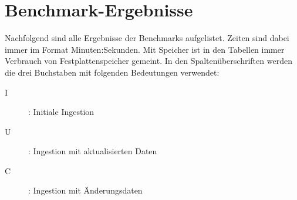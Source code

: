 \chapter{Benchmark-Ergebnisse}
\label{sec:benchmark-tables}
Nachfolgend sind alle Ergebnisse der Benchmarks aufgelistet.
Zeiten sind dabei immer im Format Minuten:Sekunden.
Mit Speicher ist in den Tabellen immer Verbrauch von Festplattenspeicher gemeint.
In den Spaltenüberschriften werden die drei Buchstaben mit folgenden Bedeutungen verwendet:
\begin{description}
    \item[I]: Initiale Ingestion
    \item[U]: Ingestion mit aktualisierten Daten
    \item[C]: Ingestion mit Änderungsdaten
\end{description}

